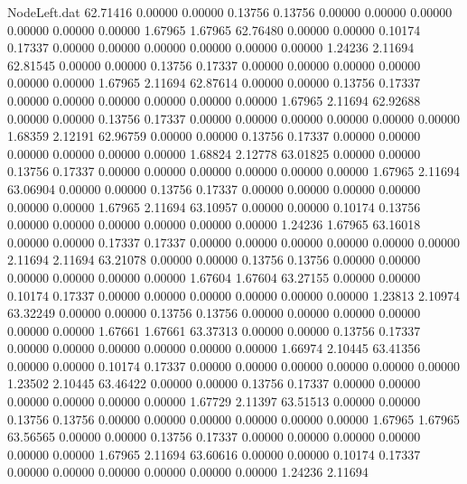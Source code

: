 \begin{filecontents}{NodeLeft.dat}
  62.71416    0.00000    0.00000     0.13756    0.13756    0.00000    0.00000    0.00000    0.00000    0.00000    0.00000    1.67965    1.67965
  62.76480    0.00000    0.00000     0.10174    0.17337    0.00000    0.00000    0.00000    0.00000    0.00000    0.00000    1.24236    2.11694
  62.81545    0.00000    0.00000     0.13756    0.17337    0.00000    0.00000    0.00000    0.00000    0.00000    0.00000    1.67965    2.11694
  62.87614    0.00000    0.00000     0.13756    0.17337    0.00000    0.00000    0.00000    0.00000    0.00000    0.00000    1.67965    2.11694
  62.92688    0.00000    0.00000     0.13756    0.17337    0.00000    0.00000    0.00000    0.00000    0.00000    0.00000    1.68359    2.12191
  62.96759    0.00000    0.00000     0.13756    0.17337    0.00000    0.00000    0.00000    0.00000    0.00000    0.00000    1.68824    2.12778
  63.01825    0.00000    0.00000     0.13756    0.17337    0.00000    0.00000    0.00000    0.00000    0.00000    0.00000    1.67965    2.11694
  63.06904    0.00000    0.00000     0.13756    0.17337    0.00000    0.00000    0.00000    0.00000    0.00000    0.00000    1.67965    2.11694
  63.10957    0.00000    0.00000     0.10174    0.13756    0.00000    0.00000    0.00000    0.00000    0.00000    0.00000    1.24236    1.67965
  63.16018    0.00000    0.00000     0.17337    0.17337    0.00000    0.00000    0.00000    0.00000    0.00000    0.00000    2.11694    2.11694
  63.21078    0.00000    0.00000     0.13756    0.13756    0.00000    0.00000    0.00000    0.00000    0.00000    0.00000    1.67604    1.67604
  63.27155    0.00000    0.00000     0.10174    0.17337    0.00000    0.00000    0.00000    0.00000    0.00000    0.00000    1.23813    2.10974
  63.32249    0.00000    0.00000     0.13756    0.13756    0.00000    0.00000    0.00000    0.00000    0.00000    0.00000    1.67661    1.67661
  63.37313    0.00000    0.00000     0.13756    0.17337    0.00000    0.00000    0.00000    0.00000    0.00000    0.00000    1.66974    2.10445
  63.41356    0.00000    0.00000     0.10174    0.17337    0.00000    0.00000    0.00000    0.00000    0.00000    0.00000    1.23502    2.10445
  63.46422    0.00000    0.00000     0.13756    0.17337    0.00000    0.00000    0.00000    0.00000    0.00000    0.00000    1.67729    2.11397
  63.51513    0.00000    0.00000     0.13756    0.13756    0.00000    0.00000    0.00000    0.00000    0.00000    0.00000    1.67965    1.67965
  63.56565    0.00000    0.00000     0.13756    0.17337    0.00000    0.00000    0.00000    0.00000    0.00000    0.00000    1.67965    2.11694
  63.60616    0.00000    0.00000     0.10174    0.17337    0.00000    0.00000    0.00000    0.00000    0.00000    0.00000    1.24236    2.11694

\end{filecontents}
